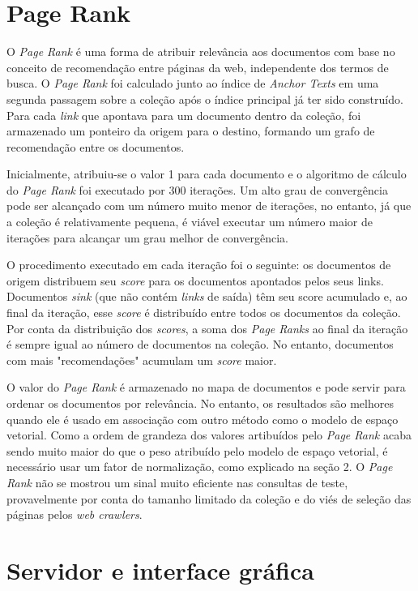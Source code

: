 \documentclass{article}
\begin{document}
\section{Page Rank}

O \textit{Page Rank} é uma forma de atribuir relevância aos documentos com base
no conceito de recomendação entre páginas da web, independente dos termos de busca. 
O \textit{Page Rank} foi calculado junto ao índice de \textit{Anchor Texts} 
em uma segunda passagem sobre a coleção após o índice principal já ter sido construído. Para cada \textit{link}
que apontava para um documento dentro da coleção, foi armazenado um ponteiro da origem para o destino,
formando um grafo de recomendação entre os documentos.

Inicialmente, atribuiu-se o valor 1 para cada documento e o algoritmo de cálculo do \textit{Page Rank} foi executado por 300 iterações.
Um alto grau de convergência pode ser alcançado com um número muito menor de iterações, no entanto, já que a coleção é relativamente
pequena, é viável executar um número maior de iterações para alcançar um grau melhor de convergência.

O procedimento executado em cada iteração foi o seguinte: os documentos de origem distribuem seu \textit{score} para os documentos apontados 
pelos seus links. Documentos \textit{sink} (que não contém \textit{links} de saída) têm seu score acumulado e, ao final da iteração,
esse \textit{score} é distribuído entre todos os documentos da coleção. Por conta da distribuição dos \textit{scores}, 
a soma dos \textit{Page Ranks} ao final da iteração é sempre igual ao número de documentos na coleção. No entanto, documentos com
mais "recomendações" acumulam um \textit{score} maior. 

O valor do \textit{Page Rank} é armazenado no mapa de documentos e pode servir para ordenar os documentos por
relevância. No entanto, os resultados são melhores quando ele é usado em associação com outro método como o modelo
de espaço vetorial. Como a ordem de grandeza dos valores artibuídos pelo \textit{Page Rank} acaba sendo muito maior
do que o peso atribuído pelo modelo de espaço vetorial, é necessário usar um fator de normalização, como explicado
na seção 2. O \textit{Page Rank} não se mostrou um sinal muito eficiente nas consultas de teste, provavelmente por
conta do tamanho limitado da coleção e do viés de seleção das páginas pelos \textit{web crawlers}.

\section{Servidor e interface gráfica}
\end{document}

